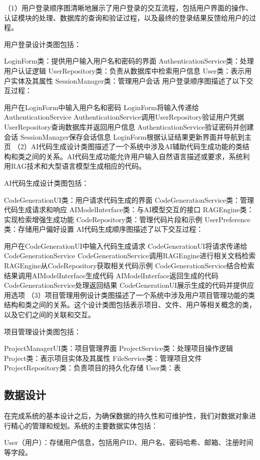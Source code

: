 \documentclass[
    report,     %
    oneside,    %
    UTF8,       %
    zihao=-4    %
]{config} %
\begin{document}
（1）用户登录顺序图清晰地展示了用户登录的交互流程，包括用户界面的操作、认证模块的处理、数据库的查询和验证过程，以及最终的登录结果反馈给用户的过程。

用户登录设计类图包括：

LoginForm类：提供用户输入用户名和密码的界面
AuthenticationService类：处理用户认证逻辑
UserRepository类：负责从数据库中检索用户信息
User类：表示用户实体及其属性
SessionManager类：管理用户会话
用户登录顺序图描述了以下交互过程：

用户在LoginForm中输入用户名和密码
LoginForm将输入传递给AuthenticationService
AuthenticationService调用UserRepository验证用户凭据
UserRepository查询数据库并返回用户信息
AuthenticationService验证密码并创建会话
SessionManager保存会话信息
LoginForm根据认证结果更新界面并导航到主页
（2）AI代码生成设计类图描述了一个系统中涉及AI辅助代码生成功能的类结构和类之间的关系。AI代码生成功能允许用户输入自然语言描述或要求，系统利用RAG技术和大型语言模型生成相应的代码。

AI代码生成设计类图包括：

CodeGenerationUI类：用户请求代码生成的界面
CodeGenerationService类：管理代码生成请求和响应
AIModelInterface类：与AI模型交互的接口
RAGEngine类：实现检索增强生成功能
CodeRepository类：管理代码片段和示例
UserPreference类：存储用户偏好设置
AI代码生成顺序图描述了以下交互过程：

用户在CodeGenerationUI中输入代码生成请求
CodeGenerationUI将请求传递给CodeGenerationService
CodeGenerationService调用RAGEngine进行相关文档检索
RAGEngine从CodeRepository获取相关代码示例
CodeGenerationService结合检索结果调用AIModelInterface生成代码
AIModelInterface返回生成的代码
CodeGenerationService处理返回结果
CodeGenerationUI展示生成的代码并提供应用选项
（3）项目管理用例设计类图描述了一个系统中涉及用户项目管理功能的类结构和类之间的关系。这个设计类图包括表示项目、文件、用户等相关概念的类，以及它们之间的关联和交互。

项目管理设计类图包括：

ProjectManagerUI类：项目管理界面
ProjectService类：处理项目操作逻辑
Project类：表示项目实体及其属性
FileService类：管理项目文件
ProjectRepository类：负责项目的持久化存储
User类：表
\subsection{数据设计}

在完成系统的基本设计之后，为确保数据的持久性和可维护性，我们对数据对象进行精心的管理和规划。系统的主要数据实体包括：

User（用户）：存储用户信息，包括用户ID、用户名、密码哈希、邮箱、注册时间等字段。
\end{document}
